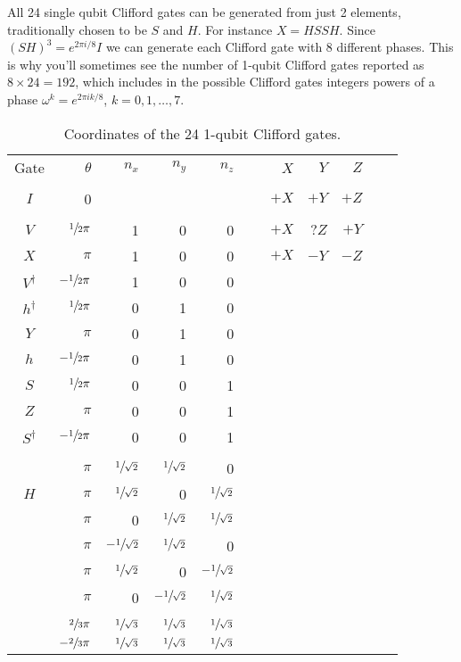 All 24 single qubit Clifford gates can be generated from just 2 elements, traditionally chosen to be $S$ and $H$. For instance $X=HSSH$. Since  $(S H)^3 = e^{2\pi i/8} I$ we can generate each Clifford gate with 8 different phases. This is why you'll sometimes see the number of 1-qubit Clifford gates reported as $8\times24=192$, which includes in the possible Clifford gates integers powers of a phase $\omega^k = e^{2\pi i k/8}$, $k ={0,1,\ldots,7}$.



\begin{table}[htp]
\caption{Coordinates of the 24 1-qubit Clifford gates.}
\label{tab:Clifford1q}
\begin{center}
\begin{tabular}{crrrrrrrcc}
Gate & $\theta$ & $n_x$ & $n_y$ & $n_z$ &~~~~  $X$ & $Y$ & $Z$ \\
\\
$I$ & 0 &&&												& $+X$ & $+Y$ & $+Z$
\\ \\
$V$ 					& $\sfrac{1}{2}\pi$ 	& 1 & 0 & 0 & $+X$ & $?Z$ & $+Y$  
\\
$X$ 					& $\pi$ 				& 1 & 0 & 0 & $+X$ & $-Y$ & $-Z$  %
\\
$ V^\dagger$   			& $-\sfrac{1}{2}\pi$ 	& 1 & 0 & 0 &%
\\
$h^\dagger$            	& $\sfrac{1}{2}\pi$ 	& 0 & 1 & 0 &%
\\
$Y$ 			      	& $\pi$ 		 		& 0 & 1 & 0 &%
\\
$h$    					& $-\sfrac{1}{2}\pi$  	& 0 & 1 & 0 &%
\\
$S$ 					& $\sfrac{1}{2}\pi$  	& 0 & 0 & 1 &%
\\
$Z$ 					& $\pi$ 				& 0 & 0 & 1 &%
\\
$S^\dagger$ 			& $-\sfrac{1}{2}\pi$ 	& 0 & 0 & 1 &%
\\
\\
						& $\pi$ 				& $\sfrac{1}{\sqrt{2}}$ & $\sfrac{1}{\sqrt{2}}$ & 0 	&%
\\
$H$						& $\pi$ 				& $\sfrac{1}{\sqrt{2}}$ &0 & $\sfrac{1}{\sqrt{2}}$ 		&%
\\
						& $\pi$ 				& 0 & $\sfrac{1}{\sqrt{2}}$ & $\sfrac{1}{\sqrt{2}}$ 	&%
\\
						& $\pi$ 				& $-\sfrac{1}{\sqrt{2}}$ & $\sfrac{1}{\sqrt{2}}$ & 0 	&%
\\
						& $\pi$ 				& $\sfrac{1}{\sqrt{2}}$ &0 & $-\sfrac{1}{\sqrt{2}}$ 	&%
\\
						& $\pi$ 				& 0 & $-\sfrac{1}{\sqrt{2}}$ & $\sfrac{1}{\sqrt{2}}$ 	&%
\\
\\
						& $\sfrac{2}{3}\pi$ 	& $\sfrac{1}{\sqrt{3}}$ & $\sfrac{1}{\sqrt{3}}$ & $\sfrac{1}{\sqrt{3}}$ & \\
						& $-\sfrac{2}{3}\pi$	& $\sfrac{1}{\sqrt{3}}$ & $\sfrac{1}{\sqrt{3}}$ & $\sfrac{1}{\sqrt{3}}$ & \\


\end{tabular}
\end{center}
\end{table}
